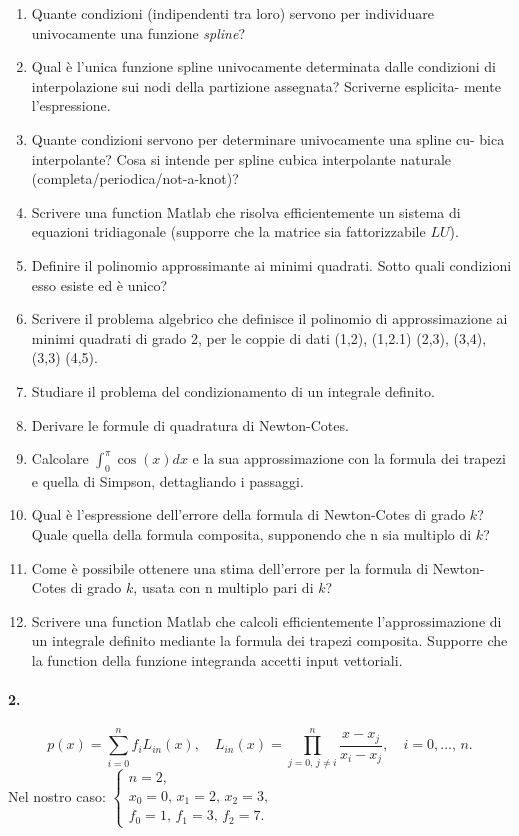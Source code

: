 \begin{enumerate}
    \item  Quante condizioni (indipendenti tra loro) servono per individuare univocamente una funzione \textit{spline}?
    \item Qual è l'unica funzione spline univocamente determinata dalle condizioni di interpolazione sui nodi della partizione assegnata? Scriverne esplicita- mente l'espressione.
    \item Quante condizioni servono per determinare univocamente una spline cu- bica interpolante? Cosa si intende per spline cubica interpolante naturale (completa/periodica/not-a-knot)?
    \item Scrivere una function Matlab che risolva efficientemente un sistema di equazioni tridiagonale (supporre che la matrice sia fattorizzabile $LU$).
    \item Definire il polinomio approssimante ai minimi quadrati. Sotto quali condizioni esso esiste ed è unico?
    \item Scrivere il problema algebrico che definisce il polinomio di approssimazione ai minimi quadrati di grado 2, per le coppie di dati (1,2), (1,2.1) (2,3), (3,4), (3,3) (4,5).
    \item Studiare il problema del condizionamento di un integrale definito.
    \item Derivare le formule di quadratura di Newton-Cotes.
    \item Calcolare $\int_0^\pi\cos{(x)}dx$ e la sua approssimazione con la formula dei trapezi e quella di Simpson, dettagliando i passaggi.
    \item Qual è l'espressione dell'errore della formula di Newton-Cotes di grado $k$? Quale quella della formula composita, supponendo che n sia multiplo di $k$?
    \item Come è possibile ottenere una stima dell'errore per la formula di Newton- Cotes di grado $k$, usata con n multiplo pari di $k$?
    \item Scrivere una function Matlab che calcoli efficientemente l'approssimazione di un integrale definito mediante la formula dei trapezi composita. Supporre che la function della funzione integranda accetti input vettoriali.
\end{enumerate}

\paragraph{2.}
\begin{equation*}
    p(x)=\sum_{i=0}^n f_iL_{in}(x),\quad L_{in}(x)=\prod_{j=0,\, j\neq i}^n\frac{x-x_j}{x_i-x_j},\quad i=0,\hdots,\, n.
\end{equation*}
Nel nostro caso:
$\begin{cases}
    n=2,\\
    x_0=0,\, x_1=2,\, x_2 = 3,\\
    f_0 = 1,\, f_1=3,\, f_2=7.
\end{cases}$

